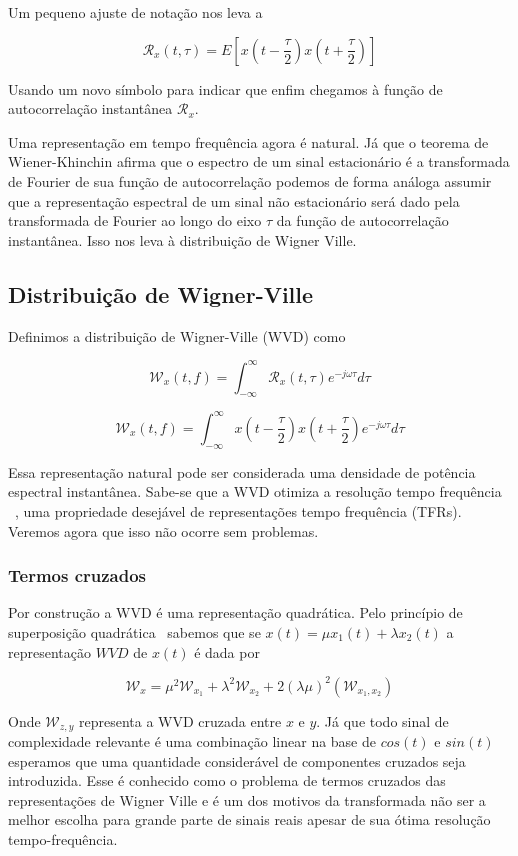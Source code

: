 Um pequeno ajuste de notação nos leva a

$$ \mathcal{R}_{x}(t, \tau) = E\left[x\left(t - \frac{\tau}{2}\right)x\left(t + \frac{\tau}{2}\right)\right] $$

Usando um novo símbolo para indicar que enfim chegamos à função de
autocorrelação instantânea $\mathcal{R}_{x}$.

Uma representação em tempo frequência agora é natural. Já que o
teorema de Wiener-Khinchin afirma que o espectro de um sinal estacionário é
a transformada de Fourier de sua função de autocorrelação podemos de forma
análoga assumir que a representação espectral de um sinal não estacionário
será dado pela transformada de Fourier ao longo do eixo $\tau$ da função de
autocorrelação instantânea. Isso nos leva à distribuição de Wigner Ville.

\subsection{Distribuição de Wigner-Ville}

Definimos a distribuição de Wigner-Ville (WVD) como

$$ \mathcal{W}_{x}(t, f) =  \int_{-\infty}^{\infty} \mathcal{R}_{x}(t, \tau) e^{-j\omega \tau}d\tau$$

$$ \mathcal{W}_{x}(t, f) =  \int_{-\infty}^{\infty} x\left(t - \frac{\tau}{2}\right)x\left(t + \frac{\tau}{2}\right) e^{-j\omega \tau}d\tau$$

Essa representação natural pode ser considerada uma densidade de potência
espectral instantânea. Sabe-se que a WVD otimiza a resolução tempo frequência
~\cite{tfr_comparison}, uma propriedade desejável de representações tempo
frequência (TFRs). Veremos agora que isso não ocorre sem problemas.

\subsubsection{Termos cruzados}

Por construção a WVD é uma representação quadrática. Pelo princípio de
superposição quadrática~\cite{quadratic_freq_representation} sabemos que se
$x(t) = \mu x_1(t) + \lambda x_2(t)$ a representação $WVD$ de $x(t)$ é dada
por

$$ \mathcal{W}_{x} = \mu^2\mathcal{W}_{x_1} + \lambda^2\mathcal{W}_{x_2} + 2(\lambda\mu)^2(\mathcal{W}_{x_1 , x_2}) $$

Onde $\mathcal{W}_{z, y}$ representa a WVD cruzada entre $x$ e $y$. Já que todo
sinal de complexidade relevante é uma combinação linear na base de $cos(t)$ e
$sin(t)$ esperamos que uma quantidade considerável de componentes cruzados seja
introduzida. Esse é conhecido como o problema de termos cruzados das
representações de Wigner Ville e é um dos motivos da transformada não ser a
melhor escolha para grande parte de sinais reais apesar de sua ótima resolução
tempo-frequência.

